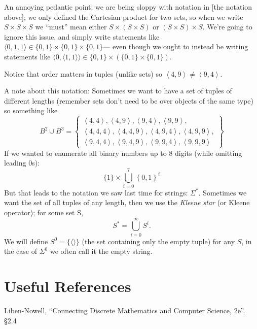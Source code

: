 \begin{tcolorbox}[colback=blue!5,colframe=blue!75!black,title=Quote from Liben-Nowell \S2.4]
An annoying pedantic point: we are being sloppy with notation in [the notation above]; 
we only defined the Cartesian product for two sets, 
so when we write $S\times S\times S$ we “must” mean either $S\times (S\times S)$ or $(S\times S)\times S$. 
We’re going to ignore this issue, and simply write statements like $\langle 0, 1, 1\rangle \in \{0, 1\}\times \{0, 1\} \times \{0, 1\}$---%
even though we ought to instead be writing statements like $\langle 0, \langle1, 1\rangle\rangle \in \{0, 1\}\times (\{0, 1\} \times \{0, 1\})$.
\end{tcolorbox}
 
Notice that order matters in tuples (unlike sets) so $ \left\langle 4,9 \right\rangle \neq \left\langle 9,4 \right\rangle$.

A note about this notation:
Sometimes we want to have a set of tuples of different lengths (remember sets don't need to be over objects of the same type) 
so something like 
\[
B^2 \cup B^3 = \left\{  \begin{matrix}\left\langle 4,4 \right\rangle, \left\langle 4,9 \right\rangle,  \left\langle 9,4 \right\rangle, \left\langle 9,9 \right\rangle,\\
				\left\langle 4,4,4 \right\rangle, \left\langle 4,4,9 \right\rangle,  \left\langle 4,9,4 \right\rangle, \left\langle 4,9,9 \right\rangle,\\
				\left\langle 9,4,4 \right\rangle, \left\langle 9,4,9 \right\rangle,  \left\langle 9,9,4 \right\rangle, \left\langle 9,9,9 \right\rangle \end{matrix}\right\}
\]
If we wanted to enumerate all binary numbers up to 8 digits (while omitting leading 0s):
\[
\{1\} \times \bigcup_{i=0}^7 \left\{0,1\right\}^i
\]
But that leads to the notation we saw last time for strings: $\Sigma^*$.
Sometimes we want the set of all tuples of any length, then we use the \emph{Kleene star} (or Kleene operator); 
for some set S, 
\[
S^* =  \bigcup_{i=0}^\infty S^i.
\]
We will define $S^0 = \{\langle\rangle\}$ (the set containing only the empty tuple) for any $S$, in the case of $\Sigma^0$ we often call it the empty string.

\section*{Useful References}
Liben-Nowell, ``Connecting Discrete Mathematics and Computer Science, 2e''. \S 2.4

